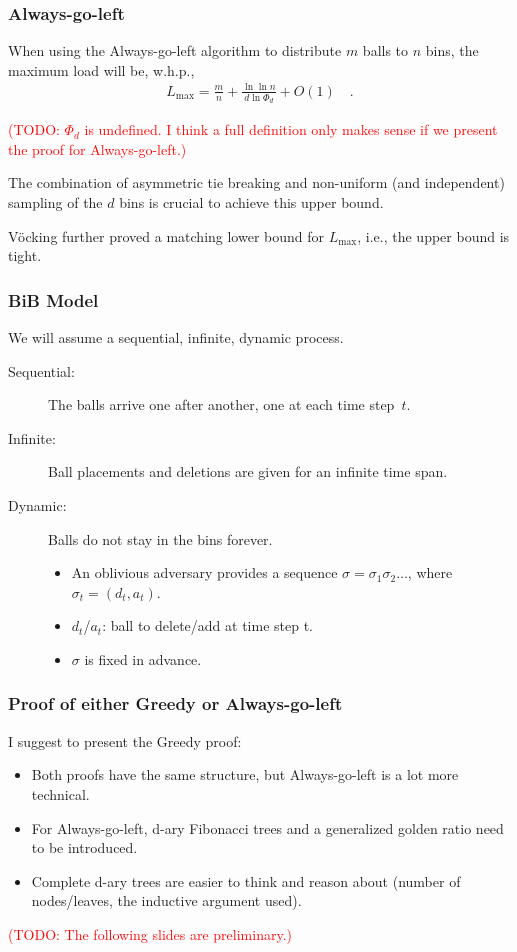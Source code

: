 \documentclass[serif,professionalfonts]{beamer}
\newcommand\todo[1]{\textcolor{red}{(TODO: #1)}}
\newcommand\load{L_{\mathrm{max}}}
\begin{document}
\begin{frame}
\frametitle{Always-go-left}
\begin{theorem}[V\"ocking, 2003]
When using the \alert{Always-go-left} algorithm to distribute $m$ balls to $n$ bins, the maximum load will be, w.h.p.,
\begin{align*}
\load = \frac{m}{n} + \frac{\ln \ln n}{d \ln \Phi_d} + O(1) \quad .
\end{align*}
\end{theorem}
\todo{$\Phi_d$ is undefined. I think a full definition only makes sense if we present the proof for Always-go-left.}

\pause
\bigskip
The combination of \alert{asymmetric tie breaking} and \alert{non-uniform} (and independent) sampling of the $d$ bins is crucial to achieve this upper bound.

\medskip
V\"ocking further proved a matching lower bound for $\load$, i.e., the upper bound is tight.

\end{frame}

\begin{frame}
\frametitle{BiB Model}
We will assume a sequential, infinite, dynamic process.

\begin{description}
\item[\alert{Sequential:}] The balls arrive one after another, one at each time step~$t$.
\item[\alert{Infinite:}] Ball placements and deletions are given for an infinite time span.
\item[\alert{Dynamic:}] Balls do not stay in the bins forever.
\begin{itemize}
\item An oblivious adversary provides a sequence $\sigma = \sigma_1 \sigma_2 \dots$, where $\sigma_t = (d_t, a_t)$.
\item $d_t$/$a_t$: ball to delete/add at time step t. \\
\item $\sigma$ is fixed in advance.
\end{itemize}
\end{description}
\end{frame}

\begin{frame}
\frametitle{Proof of either Greedy or Always-go-left}
I suggest to present the Greedy proof:
\begin{itemize}
\item Both proofs have the same structure, but Always-go-left is a lot more technical.
\item For Always-go-left, d-ary Fibonacci trees and a generalized golden ratio need to be introduced.
\item Complete d-ary trees are easier to think and reason about (number of nodes/leaves, the inductive argument used).
\end{itemize}
\todo{The following slides are preliminary.}
\end{frame}
\end{document}
